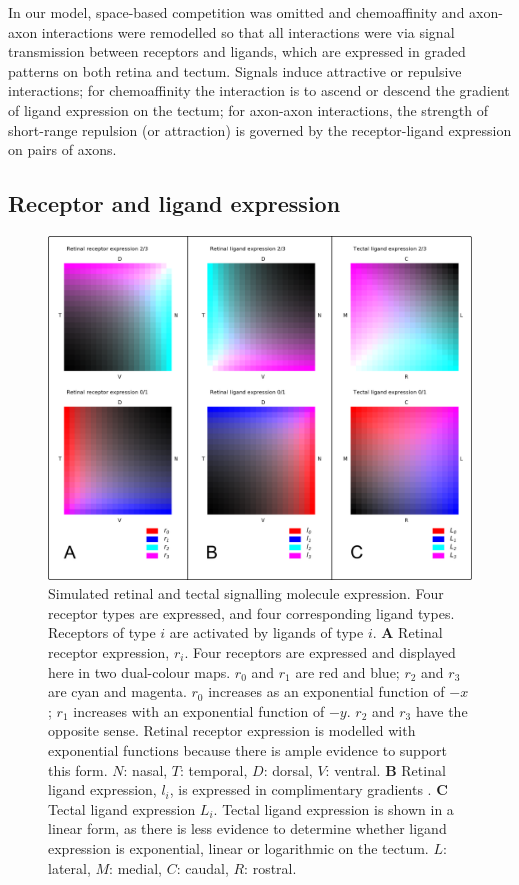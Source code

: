 \documentclass[11pt, a4paper]{article}
\begin{document}
In our model, space-based competition was omitted and chemoaffinity and
axon-axon interactions were remodelled so that all interactions were via
signal transmission between receptors and ligands, which are expressed in
graded patterns on both retina and tectum. Signals induce attractive or
repulsive interactions; for chemoaffinity the interaction is to ascend or
descend the gradient of ligand expression on the tectum; for axon-axon
interactions, the strength of short-range repulsion (or attraction) is
governed by the receptor-ligand expression on pairs of axons.

\subsection*{Receptor and ligand expression}

\begin{figure}
\includegraphics[width=\linewidth]{./images/expressions_fig.png}
\caption{Simulated retinal and tectal signalling molecule expression. Four
receptor types are expressed, and four corresponding ligand types. Receptors
of type $i$ are activated by ligands of type $i$.
%
\textbf{A} Retinal receptor expression, $r_i$. Four receptors are expressed and
displayed here in two dual-colour maps. $r_0$ and $r_1$ are red and blue;
$r_2$ and $r_3$ are cyan and magenta. $r_0$ increases as an exponential
function of $-x$; $r_1$ increases with an exponential function of $-y$. $r_2$
and $r_3$ have the opposite sense. Retinal receptor expression is modelled
with exponential functions because there is ample evidence to support this
form. $N$: nasal, $T$: temporal, $D$: dorsal, $V$: ventral.
%
\textbf{B} Retinal ligand expression, $l_i$, is expressed in complimentary
gradients \citep{hornberger_modulation_1999}.
%
\textbf{C} Tectal ligand expression $L_i$. Tectal ligand expression is shown in a linear form,
as there is less evidence to determine whether ligand expression is
exponential, linear or logarithmic on the tectum.
$L$: lateral, $M$: medial, $C$: caudal, $R$: rostral.
}
\label{f:1}
\end{figure}
\end{document}
